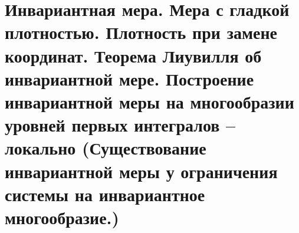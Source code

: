 \section{Инвариантная мера. Мера с гладкой плотностью. Плотность при замене координат. Теорема Лиувилля об инвариантной мере. Построение инвариантной меры на многообразии уровней первых интегралов – локально (Существование инвариантной меры у ограничения системы на инвариантное многообразие.)}\label{chasec10}



\newpage